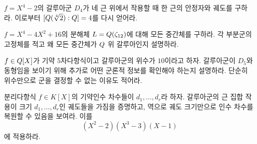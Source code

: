 \begin{exercise}
$f=X^4-2$의 갈루아군 $D_4$가 네 근 위에서 작용할 때 한 근의 안정자와 궤도를 구하라. 이로부터 $[Q(\sqrt[4]{2}):Q]=4$를 다시 얻어라.
\end{exercise}

\begin{exercise}[*]
$f=X^4-4X^2+16$의 분해체 $L=Q(\zeta_{12})$에 대해 모든 중간체를 구하라. 각 부분군의 고정체를 적고 왜 모든 중간체가 $Q$ 위 갈루아인지 설명하라.
\end{exercise}

\begin{exercise}
$f\in Q[X]$가 기약 $5$차다항식이고 갈루아군의 위수가 $10$이라고 하자. 갈루아군이 $D_5$와 동형임을 보이기 위해 추가로 어떤 군론적 정보를 확인해야 하는지 설명하라. 단순히 위수만으로 군을 결정할 수 없는 이유도 적어라.
\end{exercise}

\begin{exercise}[*]
분리다항식 $f\in K[X]$의 기약인수 차수들이 $d_1,\dots,d_r$라 하자. 갈루아군의 근 집합 작용이 크기 $d_1,\dots,d_r$인 궤도들을 가짐을 증명하고, 역으로 궤도 크기만으로 인수 차수를 복원할 수 있음을 보여라. 이를
\[
  (X^2-2)(X^3-3)(X-1)
\]
에 적용하라.
\end{exercise}
